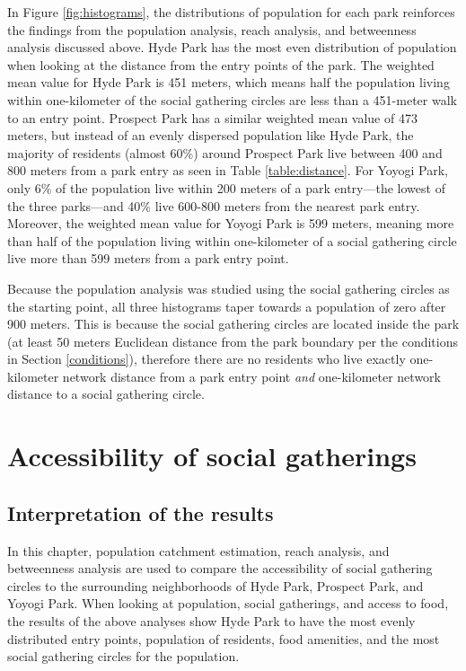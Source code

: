 \begin{multicols}{2}

In Figure \ref{fig:histograms}, the distributions of population for each park reinforces the findings from the population analysis, reach analysis, and betweenness analysis discussed above. Hyde Park has the most even distribution of population when looking at the distance from the entry points of the park. The weighted mean value for Hyde Park is 451 meters, which means half the population living within one-kilometer of the social gathering circles are less than a 451-meter walk to an entry point. Prospect Park has a similar weighted mean value of 473 meters, but instead of an evenly dispersed population like Hyde Park, the majority of residents (almost 60\%) around Prospect Park live between 400 and 800 meters from a park entry as seen in Table \ref{table:distance}. For Yoyogi Park, only 6\% of the population live within 200 meters of a park entry---the lowest of the three parks---and 40\% live 600-800 meters from the nearest park entry. Moreover, the weighted mean value for Yoyogi Park is 599 meters, meaning more than half of the population living within one-kilometer of a social gathering circle live more than 599 meters from a park entry point. 

Because the population analysis was studied using the social gathering circles as the starting point, all three histograms taper towards a population of zero after 900 meters. This is because the social gathering circles are located inside the park (at least 50 meters Euclidean distance from the park boundary per the conditions in Section \ref{conditions}), therefore there are no residents who live exactly one-kilometer network distance from a park entry point \textit{and} one-kilometer network distance to a social gathering circle. 

\section{Accessibility of social gatherings}
\subsection{Interpretation of the results}
In this chapter, population catchment estimation, reach analysis, and betweenness analysis are used to compare the accessibility of social gathering circles to the surrounding neighborhoods of Hyde Park, Prospect Park, and Yoyogi Park. When looking at population, social gatherings, and access to food, the results of the above analyses show Hyde Park to have the most evenly distributed entry points, population of residents, food amenities, and the most social gathering circles for the population. 


\end{multicols}
